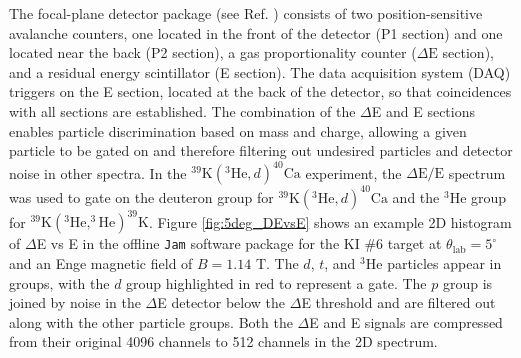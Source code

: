 The focal-plane detector package (see Ref. \cite{Marshall2019}) consists of two position-sensitive avalanche counters, one located in the front of the detector (P1 section) and one located near the back (P2 section), a gas proportionality counter ($\Delta\mathrm{E}$ section), and a residual energy scintillator (E section). The data acquisition system (DAQ) triggers on the E section, located at the back of the detector, so that coincidences with all sections are established. The combination of the $\Delta$E and E sections enables particle discrimination based on mass and charge, allowing a given particle to be gated on and therefore filtering out undesired particles and detector noise in other spectra. In the $^{39}\mathrm{K}(^{3}\mathrm{He},d)^{40}\mathrm{Ca}$ experiment, the $\Delta\mathrm{E}/\mathrm{E}$ spectrum was used to gate on the deuteron group for $^{39}\mathrm{K}(^{3}\mathrm{He},d)^{40}\mathrm{Ca}$ and the $^{3}\mathrm{He}$ group for $^{39}\mathrm{K}(^{3}\mathrm{He},^{3}\mathrm{He})^{39}\mathrm{K}$. Figure \ref{fig:5deg_DEvsE} shows an example 2D histogram of $\Delta$E vs E in the offline \texttt{Jam} software package \cite{Swartz2001,Jam} for the KI $\#$6 target at $\theta_{\mathrm{lab}} = 5^{\circ}$ and an Enge magnetic field of $B = 1.14$ T. The $d$, $t$, and $^{3}$He particles appear in groups, with the $d$ group highlighted in red to represent a gate. The $p$ group is joined by noise in the $\Delta$E detector below the $\Delta$E threshold and are filtered out along with the other particle groups. Both the $\Delta$E and E signals are compressed from their original 4096 channels to 512 channels in the 2D spectrum. 

\def\yTS{1.29} %
\def\xTS{2.165} %

